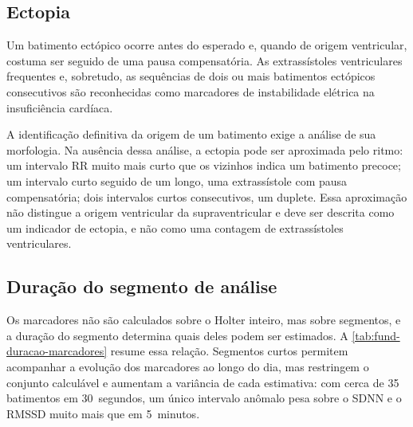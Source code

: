 \subsection{Ectopia}
\label{subsec:fund-ectopia}

Um batimento ectópico ocorre antes do esperado e, quando de origem
ventricular, costuma ser seguido de uma pausa compensatória. As
extrassístoles ventriculares frequentes e, sobretudo, as sequências de dois
ou mais batimentos ectópicos consecutivos são reconhecidas como marcadores
de instabilidade elétrica na insuficiência cardíaca.

A identificação definitiva da origem de um batimento exige a análise de sua
morfologia. Na ausência dessa análise, a ectopia pode ser aproximada pelo
ritmo: um intervalo RR muito mais curto que os vizinhos indica um batimento
precoce; um intervalo curto seguido de um longo, uma extrassístole com
pausa compensatória; dois intervalos curtos consecutivos, um duplete. Essa
aproximação não distingue a origem ventricular da supraventricular e deve
ser descrita como um indicador de ectopia, e não como uma contagem de
extrassístoles ventriculares.

\subsection{Duração do segmento de análise}
\label{subsec:fund-duracao-segmento}

Os marcadores não são calculados sobre o Holter inteiro, mas sobre
segmentos, e a duração do segmento determina quais deles podem ser
estimados. A \autoref{tab:fund-duracao-marcadores} resume essa relação.
Segmentos curtos permitem acompanhar a evolução dos marcadores ao longo do
dia, mas restringem o conjunto calculável e aumentam a variância de cada
estimativa: com cerca de 35 batimentos em 30~segundos, um único intervalo
anômalo pesa sobre o \gls{SDNN} e o \gls{RMSSD} muito mais que em 5~minutos.

